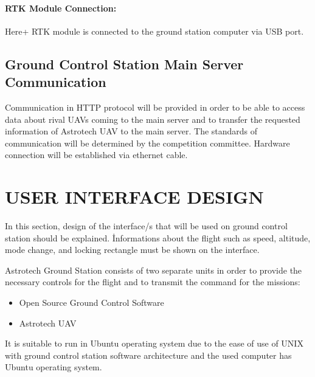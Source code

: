 \documentclass[12pt]{article}
\begin{document}
\paragraph*{RTK Module Connection:} Here+ RTK module is connected to the ground station computer via USB port.

\subsection{Ground Control Station Main Server Communication}
Communication in HTTP protocol will be provided in order to be able to access data about rival UAVs coming to the main server and to transfer the requested information of Astrotech UAV to the main server. The standards of communication will be determined by the competition committee. Hardware connection will be established via ethernet cable.

\section{USER INTERFACE DESIGN}
In this section, design of the interface/s that will be used on ground control station should be explained. İnformations about the flight such as speed, altitude, mode change, and locking rectangle must be shown on the interface.

\justify
Astrotech Ground Station consists of two separate units in order to provide the necessary controls for the flight and to transmit the command for the missions:

\begin{itemize}
	\item Open Source Ground Control Software
	\item Astrotech UAV
\end{itemize}

It is suitable to run in Ubuntu operating system due to the ease of use of UNIX with ground control station software architecture and the used computer has Ubuntu operating system.
\end{document}
